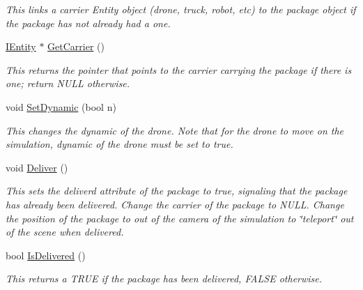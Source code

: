 \begin{DoxyCompactItemize}
\begin{DoxyCompactList}\small\item\em This links a carrier Entity object (drone, truck, robot, etc) to the package object if the package has not already had a one. \end{DoxyCompactList}\item 
\mbox{\label{classcsci3081_1_1Package_acf298d89a9d964a38cc451dd3c57f984}} 
\hyperlink{classentity__project_1_1IEntity}{I\+Entity} $\ast$ \hyperlink{classcsci3081_1_1Package_acf298d89a9d964a38cc451dd3c57f984}{Get\+Carrier} ()
\begin{DoxyCompactList}\small\item\em This returns the pointer that points to the carrier carrying the package if there is one; return N\+U\+LL otherwise. \end{DoxyCompactList}\item 
void \hyperlink{classcsci3081_1_1Package_aa481bfe50ca15db8c19eadbeac91b889}{Set\+Dynamic} (bool n)
\begin{DoxyCompactList}\small\item\em This changes the dynamic of the drone. Note that for the drone to move on the simulation, dynamic of the drone must be set to true. \end{DoxyCompactList}\item 
\mbox{\label{classcsci3081_1_1Package_a6ee0a24832784064cd3938d3cfddb9d7}} 
void \hyperlink{classcsci3081_1_1Package_a6ee0a24832784064cd3938d3cfddb9d7}{Deliver} ()
\begin{DoxyCompactList}\small\item\em This sets the deliverd attribute of the package to true, signaling that the package has already been delivered. Change the carrier of the package to N\+U\+LL. Change the position of the package to out of the camera of the simulation to \char`\"{}teleport\char`\"{} out of the scene when delivered. \end{DoxyCompactList}\item 
\mbox{\label{classcsci3081_1_1Package_a725716addd162b42a08ccddf9bdfcfa9}} 
bool \hyperlink{classcsci3081_1_1Package_a725716addd162b42a08ccddf9bdfcfa9}{Is\+Delivered} ()
\begin{DoxyCompactList}\small\item\em This returns a T\+R\+UE if the package has been delivered, F\+A\+L\+SE otherwise. \end{DoxyCompactList}\item 

\end{DoxyCompactItemize}
